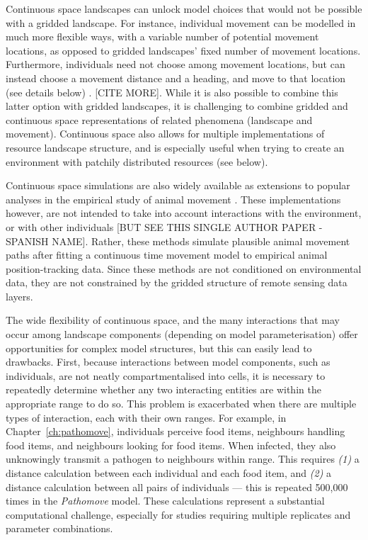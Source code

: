 Continuous space landscapes can unlock model choices that would not be possible with a gridded landscape.
For instance, individual movement can be modelled in much more flexible ways, with a variable number of potential movement locations, as opposed to gridded landscapes' fixed number of movement locations.
Furthermore, individuals need not choose among movement locations, but can instead choose a movement distance and a heading, and move to that location (see details below) \citep{spiegel2017,mueller2011}. [CITE MORE].
While it is also possible to combine this latter option with gridded landscapes, it is challenging to combine gridded and continuous space representations of related phenomena (landscape and movement).
Continuous space also allows for multiple implementations of resource landscape structure, and is especially useful when trying to create an environment with patchily distributed resources (see below).

Continuous space simulations are also widely available as extensions to popular analyses in the empirical study of animal movement \citep{noonan2019,calabrese2016,calabrese2018,fleming2014,fleming2015,gurarie2017,gurarie2016}.
These implementations however, are not intended to take into account interactions with the environment, or with other individuals [BUT SEE THIS SINGLE AUTHOR PAPER - SPANISH NAME].
Rather, these methods simulate plausible animal movement paths after fitting a continuous time movement model to empirical animal position-tracking data.
Since these methods are not conditioned on environmental data, they are not constrained by the gridded structure of remote sensing data layers.

The wide flexibility of continuous space, and the many interactions that may occur among landscape components (depending on model parameterisation) offer opportunities for complex model structures, but this can easily lead to drawbacks.
First, because interactions between model components, such as individuals, are not neatly compartmentalised into cells, it is necessary to repeatedly determine whether any two interacting entities are within the appropriate range to do so.
This problem is exacerbated when there are multiple types of interaction, each with their own ranges.
For example, in Chapter~\ref{ch:pathomove}, individuals perceive food items, neighbours handling food items, and neighbours looking for food items.
When infected, they also unknowingly transmit a pathogen to neighbours within range.
This requires \emph{(1)} a distance calculation between each individual and each food item, and \emph{(2)} a distance calculation between all pairs of individuals --- this is repeated 500,000 times in the \emph{Pathomove} model.
These calculations represent a substantial computational challenge, especially for studies requiring multiple replicates and parameter combinations.

